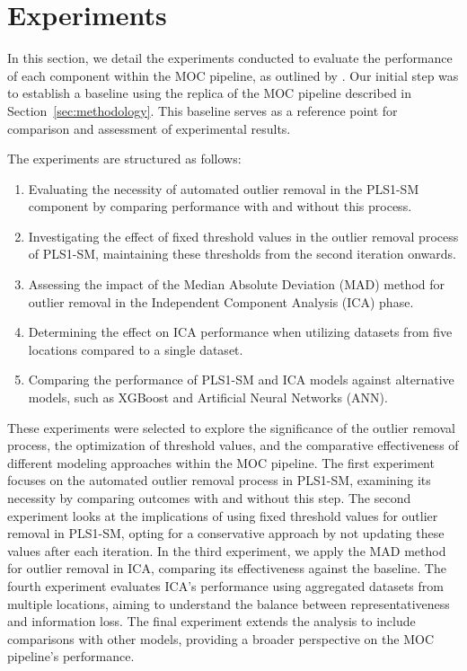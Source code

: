\section{Experiments}\label{sec:experiments}
In this section, we detail the experiments conducted to evaluate the performance of each component within the MOC pipeline, as outlined by \citet{cleggRecalibrationMarsScience2017}.
Our initial step was to establish a baseline using the replica of the MOC pipeline described in Section~\ref{sec:methodology}.
This baseline serves as a reference point for comparison and assessment of experimental results.

The experiments are structured as follows:

\begin{enumerate}
    \item Evaluating the necessity of automated outlier removal in the PLS1-SM component by comparing performance with and without this process.
    \item Investigating the effect of fixed threshold values in the outlier removal process of PLS1-SM, maintaining these thresholds from the second iteration onwards.
    \item Assessing the impact of the Median Absolute Deviation (MAD) method for outlier removal in the Independent Component Analysis (ICA) phase.
    \item Determining the effect on ICA performance when utilizing datasets from five locations compared to a single dataset.
    \item Comparing the performance of PLS1-SM and ICA models against alternative models, such as XGBoost and Artificial Neural Networks (ANN).
\end{enumerate}

These experiments were selected to explore the significance of the outlier removal process, the optimization of threshold values, and the comparative effectiveness of different modeling approaches within the MOC pipeline.
The first experiment focuses on the automated outlier removal process in PLS1-SM, examining its necessity by comparing outcomes with and without this step.
The second experiment looks at the implications of using fixed threshold values for outlier removal in PLS1-SM, opting for a conservative approach by not updating these values after each iteration.
In the third experiment, we apply the MAD method for outlier removal in ICA, comparing its effectiveness against the baseline.
The fourth experiment evaluates ICA's performance using aggregated datasets from multiple locations, aiming to understand the balance between representativeness and information loss.
The final experiment extends the analysis to include comparisons with other models, providing a broader perspective on the MOC pipeline's performance.



